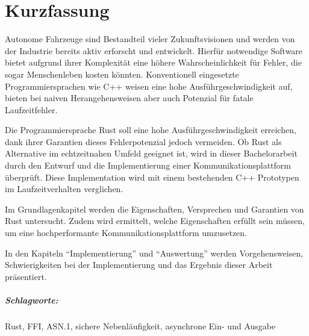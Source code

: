 \chapter*{Kurzfassung}


Autonome Fahrzeuge sind Bestandteil vieler Zukunftsvisionen und werden von der Industrie bereits aktiv erforscht und entwickelt.
Hierfür notwendige Software bietet aufgrund ihrer Komplexität eine höhere Wahrscheinlichkeit für Fehler, die sogar Menschenleben kosten könnten.
Konventionell eingesetzte Programmiersprachen wie C++ weisen eine hohe Ausführgeschwindigkeit auf, bieten bei naiven Herangehensweisen aber auch Potenzial für fatale Laufzeitfehler.

Die Programmiersprache Rust soll eine hohe Ausführgeschwindigkeit erreichen, dank ihrer Garantien dieses Fehlerpotenzial jedoch vermeiden.
Ob Rust als Alternative im echtzeitnahen Umfeld geeignet ist, wird in dieser Bachelorarbeit durch den Entwurf und die Implementierung einer Kommunikationsplattform überprüft.
Diese Implementation wird mit einem bestehenden C++ Prototypen im Laufzeitverhalten verglichen.



Im Grundlagenkapitel werden  die Eigenschaften, Versprechen und Garantien von Rust untersucht.
Zudem wird ermittelt, welche Eigenschaften erfüllt sein müssen, um eine hochperformante Kommunikationsplattform umzusetzen.

In den Kapiteln \enquote{Implementierung} und \enquote{Auswertung} werden Vorgehensweisen, Schwierigkeiten bei der Implementierung und das Ergebnis dieser Arbeit präsentiert.

\paragraph{Schlagworte:} Rust, FFI, ASN.1, sichere Nebenläufigkeit, asynchrone Ein- und Ausgabe